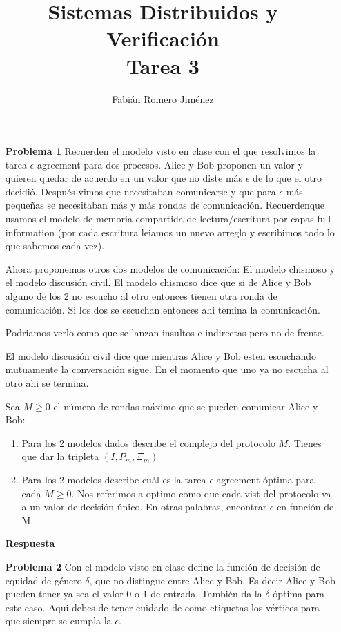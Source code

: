 \documentclass{article}
\title{Sistemas Distribuidos y Verificación \\ Tarea 3}
\author{Fabián Romero Jiménez}
\date{}
\begin{document}
\maketitle
\begin{enumerate}

\item[\bf{Problema 1}]  Recuerden el modelo visto en clase con el que resolvimos la tarea 
$\epsilon$-agreement para dos procesos. 
Alice y Bob proponen un valor y quieren quedar de acuerdo en un valor que no diste más $\epsilon$ de lo que el otro decidió. Después vimos que necesitaban comunicarse y que para $\epsilon$ más pequeñas se necesitaban más y más rondas de comunicación.
 Recuerdenque usamos el modelo de memoria compartida de lectura/escritura por capas full information (por cada escritura leiamos un nuevo arreglo y escribimos todo lo que sabemos cada vez).

Ahora proponemos otros dos modelos de comunicación:
El modelo chismoso y el modelo discusión civil. El modelo chismoso dice que si de Alice
y Bob alguno de los 2 no escucho al otro entonces tienen otra ronda de comunicación.
 Si los dos se escuchan entonces ahi temina la comunicación.

Podriamos verlo como que se lanzan insultos e indirectas pero no de frente.

El modelo discusión civil dice que mientras Alice y Bob esten escuchando mutuamente la conversación sigue. En el momento que uno ya no escucha al otro ahi se termina.

Sea $M \ge 0$ el número de rondas máximo que se pueden comunicar Alice
y Bob:

\begin{enumerate}
\item Para los 2 modelos dados describe el complejo del protocolo $M$. Tienes que dar la tripleta $( I, P_m , \Xi_ m)$
\item  Para los 2 modelos describe cuál es la tarea  $\epsilon$-agreement óptima para cada $M \ge 0$. Nos referimos a optimo como que cada vist del protocolo va a un valor de decisión único.
En otras palabras, encontrar $\epsilon$ en función de M.
\end{enumerate}

\item[\bf{Respuesta}]

\item[\bf{Problema 2}] Con el modelo visto en clase define la función de decisión de equidad de género $\delta$, que no distingue entre Alice y Bob. Es decir Alice y Bob pueden tener ya sea el valor 0 o 1 de entrada. También da la $\delta$ óptima para este caso. Aqui debes de tener cuidado de como etiquetas los vértices para que siempre se cumpla la $\epsilon$.


\end{enumerate}
\end{document}

